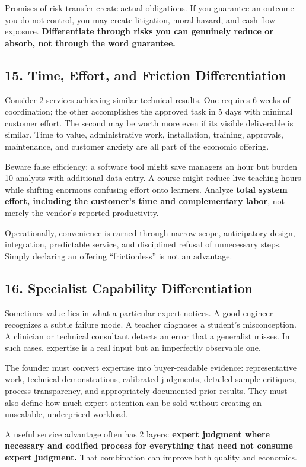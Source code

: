 Promises of risk transfer create actual obligations. If you guarantee an outcome you do not control, you may create litigation, moral hazard, and cash-flow exposure. \textbf{Differentiate through risks you can genuinely reduce or absorb, not through the word guarantee.}

\subsection*{15. Time, Effort, and Friction Differentiation}

Consider 2 services achieving similar technical results. One requires 6 weeks of coordination; the other accomplishes the approved task in 5 days with minimal customer effort. The second may be worth more even if its visible deliverable is similar. Time to value, administrative work, installation, training, approvals, maintenance, and customer anxiety are all part of the economic offering.

Beware false efficiency: a software tool might save managers an hour but burden 10 analysts with additional data entry. A course might reduce live teaching hours while shifting enormous confusing effort onto learners. Analyze \textbf{total system effort, including the customer's time and complementary labor}, not merely the vendor's reported productivity.

Operationally, convenience is earned through narrow scope, anticipatory design, integration, predictable service, and disciplined refusal of unnecessary steps. Simply declaring an offering ``frictionless'' is not an advantage.

\subsection*{16. Specialist Capability Differentiation}

Sometimes value lies in what a particular expert notices. A good engineer recognizes a subtle failure mode. A teacher diagnoses a student's misconception. A clinician or technical consultant detects an error that a generalist misses. In such cases, expertise is a real input but an imperfectly observable one.

The founder must convert expertise into buyer-readable evidence: representative work, technical demonstrations, calibrated judgments, detailed sample critiques, process transparency, and appropriately documented prior results. They must also define how much expert attention can be sold without creating an unscalable, underpriced workload.

A useful service advantage often has 2 layers: \textbf{expert judgment where necessary and codified process for everything that need not consume expert judgment.} That combination can improve both quality and economics.
